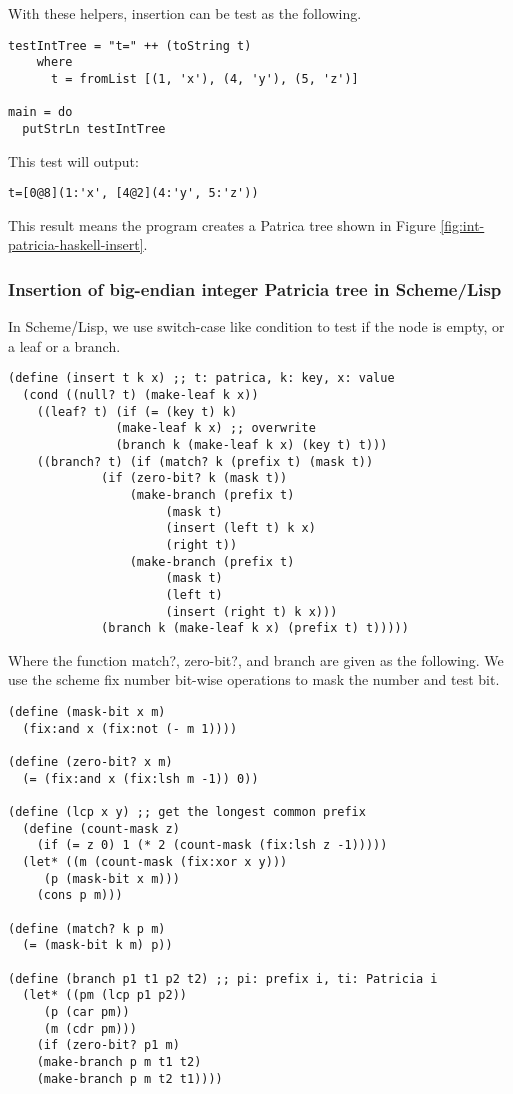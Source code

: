 \documentclass{article}
\begin{document}
With these helpers, insertion can be test as the following.

\begin{lstlisting}
testIntTree = "t=" ++ (toString t) 
    where
      t = fromList [(1, 'x'), (4, 'y'), (5, 'z')]

main = do
  putStrLn testIntTree
\end{lstlisting}

This test will output:

\begin{verbatim}
t=[0@8](1:'x', [4@2](4:'y', 5:'z'))
\end{verbatim}

This result means the program creates a Patrica tree shown in
Figure \ref{fig:int-patricia-haskell-insert}.

\subsubsection*{Insertion of big-endian integer Patricia tree in
Scheme/Lisp}

In Scheme/Lisp, we use switch-case like condition to test if the node
is empty, or a leaf or a branch. 

\lstset{language=lisp}
\begin{lstlisting}
(define (insert t k x) ;; t: patrica, k: key, x: value
  (cond ((null? t) (make-leaf k x))
	((leaf? t) (if (= (key t) k) 
		       (make-leaf k x) ;; overwrite
		       (branch k (make-leaf k x) (key t) t)))
	((branch? t) (if (match? k (prefix t) (mask t))
			 (if (zero-bit? k (mask t))
			     (make-branch (prefix t) 
					  (mask t) 
					  (insert (left t) k x) 
					  (right t))
			     (make-branch (prefix t)
					  (mask t)
					  (left t)
					  (insert (right t) k x)))
			 (branch k (make-leaf k x) (prefix t) t)))))
\end{lstlisting}

Where the function match?, zero-bit?, and branch are given as the
following. We use the scheme fix number bit-wise operations to mask the
number and test bit.

\begin{lstlisting}
(define (mask-bit x m)
  (fix:and x (fix:not (- m 1))))

(define (zero-bit? x m)
  (= (fix:and x (fix:lsh m -1)) 0))

(define (lcp x y) ;; get the longest common prefix
  (define (count-mask z)
    (if (= z 0) 1 (* 2 (count-mask (fix:lsh z -1)))))
  (let* ((m (count-mask (fix:xor x y)))
	 (p (mask-bit x m)))
    (cons p m)))

(define (match? k p m)
  (= (mask-bit k m) p))
	
(define (branch p1 t1 p2 t2) ;; pi: prefix i, ti: Patricia i
  (let* ((pm (lcp p1 p2)) 
	 (p (car pm)) 
	 (m (cdr pm)))
    (if (zero-bit? p1 m)
	(make-branch p m t1 t2)
	(make-branch p m t2 t1))))
\end{lstlisting}
\end{document}
